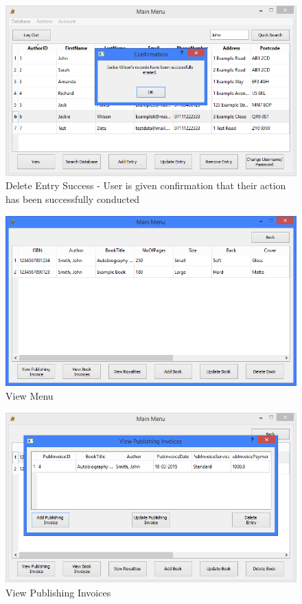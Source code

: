 \begin{figure}[H]
    \caption{Delete Entry Success - User is given confirmation that their action has been successfully conducted} \label{fig:DeleteEntrySuccess}
    \includegraphics[width=\textwidth]{./Maintenance/UserInterface/DeleteEntrySuccess.png}
\end{figure}

\begin{figure}[H]
    \caption{View Menu} \label{fig:ViewMenu}
    \includegraphics[width=\textwidth]{./Maintenance/UserInterface/ViewMenu.png}
\end{figure}

\begin{figure}[H]
    \caption{View Publishing Invoices} \label{fig:ViewPubInvoices}
    \includegraphics[width=\textwidth]{./Maintenance/UserInterface/ViewPubInvoices.png}
\end{figure}

